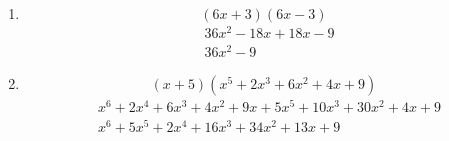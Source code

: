 \documentclass[12pt,letterpaper]{report}
\begin{document}
\begin{enumerate}
\item \begin{equation*}
    (6x+3)(6x-3)
\end{equation*}
\begin{align*}
    &36x^2-18x+18x-9\\
    &36x^2-9
\end{align*}
\item \begin{equation*}
    (x+5)(x^5+2x^3+6x^2+4x+9)
\end{equation*}
\begin{align*}
    &x^6+2x^4+6x^3+4x^2+9x+5x^5+10x^3+30x^2+4x+9\\
    &x^6+5x^5+2x^4+16x^3+34x^2+13x+9
\end{align*}
\end{enumerate}
\end{document}
